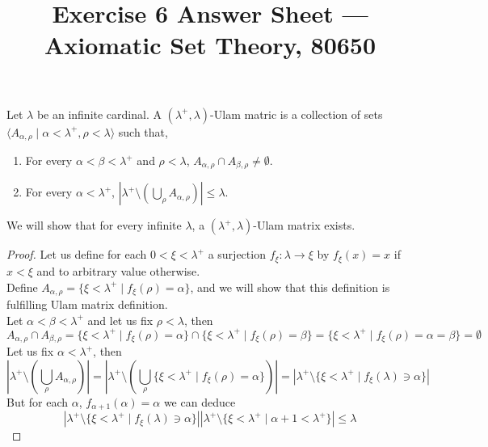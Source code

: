 
\title{Exercise 6 Answer Sheet --- Axiomatic Set Theory, 80650}


\maketitle
\maketitleprint{}

\question{}
Let $\lambda$ be an infinite cardinal.
A $(\lambda^+, \lambda)$-Ulam matric is a collection of sets $\langle A_{\alpha, \rho} \mid \alpha < \lambda^+, \rho < \lambda \rangle$ such that,
\begin{enumerate}
	\item For every $\alpha < \beta < \lambda^+$ and $\rho < \lambda$, $A_{\alpha, \rho} \cap A_{\beta, \rho} \ne \emptyset$.
	\item For every $\alpha < \lambda^+$, $|\lambda^+ \setminus (\bigcup_\rho A_{\alpha, \rho})| \le \lambda$.
\end{enumerate}

\subquestion{}
We will show that for every infinite $\lambda$, a $(\lambda^+, \lambda)$-Ulam matrix exists.
\begin{proof}
	Let us define for each $0 < \xi < \lambda^+$ a surjection $f_\xi : \lambda \to \xi$ by $f_\xi(x) = x$ if $x < \xi$ and to arbitrary value otherwise. \\
	Define $A_{\alpha, \rho} = \{ \xi < \lambda^+ \mid f_\xi(\rho) = \alpha \}$, and we will show that this definition is fulfilling Ulam matrix definition. \\
	Let $\alpha < \beta < \lambda^+$ and let us fix $\rho < \lambda$, then
	\[
		A_{\alpha, \rho} \cap A_{\beta, \rho}
		= \{ \xi < \lambda^+ \mid f_\xi(\rho) = \alpha \} \cap \{ \xi < \lambda^+ \mid f_\xi(\rho) = \beta \}
		= \{ \xi < \lambda^+ \mid f_\xi(\rho) = \alpha = \beta \}
		= \emptyset
	\]
	Let us fix $\alpha < \lambda^+$, then
	\[
		\left\lvert \lambda^+ \setminus \left(\bigcup_\rho A_{\alpha, \rho}\right) \right\rvert
		= \left\lvert \lambda^+ \setminus \left(\bigcup_\rho \{ \xi < \lambda^+ \mid f_\xi(\rho) = \alpha \} \right) \right\rvert
		= \left\lvert \lambda^+ \setminus \{ \xi < \lambda^+ \mid f_\xi(\lambda) \ni \alpha \} \right\rvert
	\]
	But for each $\alpha$, $f_{\alpha + 1}(\alpha) = \alpha$ we can deduce
	\[
		\left\lvert \lambda^+ \setminus \{ \xi < \lambda^+ \mid f_\xi(\lambda) \ni \alpha \} \right\rvert
		\left\lvert \lambda^+ \setminus \{ \xi < \lambda^+ \mid \alpha + 1 < \lambda^+ \} \right\rvert
		\le \lambda
	\]
\end{proof}


